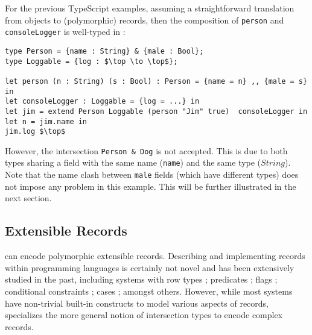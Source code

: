 For the previous TypeScript examples, assuming a straightforward
translation from objects to (polymorphic) records, then the
composition of \lstinline{person} and \lstinline{consoleLogger} is
well-typed in \name:

\begin{lstlisting}[mathescape=true]
type Person = {name : String} & {male : Bool};
type Loggable = {log : $\top \to \top$};

let person (n : String) (s : Bool) : Person = {name = n} ,, {male = s} in
let consoleLogger : Loggable = {log = ...} in
let jim = extend Person Loggable (person "Jim" true)  consoleLogger in
let n = jim.name in
jim.log $\top$
\end{lstlisting}

However, the intersection \lstinline$Person & Dog$ is not accepted.
This is due to both types sharing a field with the same name (\lstinline$name$) 
and the same type ($String$). 
Note that the name clash between \lstinline$male$ fields (which have
different types) does not impose any 
problem in this example.
This will be further illustrated in the next section.

\subsection{Extensible Records}
\name can encode polymorphic extensible records. Describing and
implementing records within programming languages is certainly not
novel and has been extensively studied in the past, including
systems with row types \cite{wand1987complete,wand1989type}; 
predicates \cite{harper1990extensible,harper1991record,gaster1996polymorphic}; 
flags \cite{remy1993type}; conditional constraints \cite{pottier2003constraint};
cases \cite{blume2006extensible}; amongst others. However, while 
most systems have non-trivial built-in constructs to model various aspects of
records, \name specializes the more general notion of intersection
types to encode complex records.

